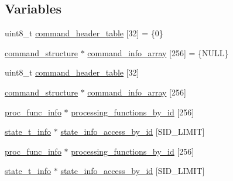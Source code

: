 \subsection*{\-Variables}
\begin{DoxyCompactItemize}
\item 
uint8\-\_\-t \hyperlink{group__control__tables_gad95e17426b114a04135420ae71fad638}{command\-\_\-header\-\_\-table} \mbox{[}32\mbox{]} = \{0\}
\item 
\hyperlink{structcommand__structure}{command\-\_\-structure} $\ast$ \hyperlink{group__control__tables_ga787ed232eeca1469a58bea3d268f1ba4}{command\-\_\-info\-\_\-array} \mbox{[}256\mbox{]} = \{\-N\-U\-L\-L\}
\item 
uint8\-\_\-t \hyperlink{group__control__tables_gad95e17426b114a04135420ae71fad638}{command\-\_\-header\-\_\-table} \mbox{[}32\mbox{]}
\item 
\hyperlink{structcommand__structure}{command\-\_\-structure} $\ast$ \hyperlink{group__control__tables_ga787ed232eeca1469a58bea3d268f1ba4}{command\-\_\-info\-\_\-array} \mbox{[}256\mbox{]}
\item 
\hyperlink{structproc__func__info}{proc\-\_\-func\-\_\-info} $\ast$ \hyperlink{group__control__tables_ga71b229d28824a0096f4f05aed00960a0}{processing\-\_\-functions\-\_\-by\-\_\-id} \mbox{[}256\mbox{]}
\item 
\hyperlink{structstate__t__info}{state\-\_\-t\-\_\-info} $\ast$ \hyperlink{group__control__tables_gac88bd7197a23c03d99042566d75f3884}{state\-\_\-info\-\_\-access\-\_\-by\-\_\-id} \mbox{[}\-S\-I\-D\-\_\-\-L\-I\-M\-I\-T\mbox{]}
\item 
\hyperlink{structproc__func__info}{proc\-\_\-func\-\_\-info} $\ast$ \hyperlink{group__control__tables_ga71b229d28824a0096f4f05aed00960a0}{processing\-\_\-functions\-\_\-by\-\_\-id} \mbox{[}256\mbox{]}
\item 
\hyperlink{structstate__t__info}{state\-\_\-t\-\_\-info} $\ast$ \hyperlink{group__control__tables_gac88bd7197a23c03d99042566d75f3884}{state\-\_\-info\-\_\-access\-\_\-by\-\_\-id} \mbox{[}\-S\-I\-D\-\_\-\-L\-I\-M\-I\-T\mbox{]}
\end{DoxyCompactItemize}
